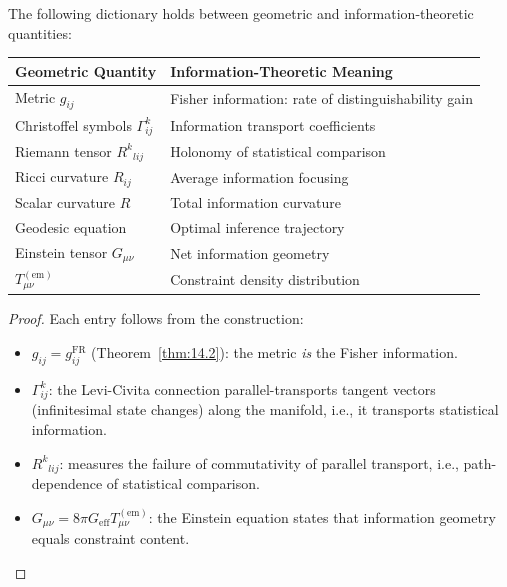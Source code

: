 \begin{theorem}\label{thm:14.10}
The following dictionary holds between geometric and
information-theoretic quantities:
\begin{center}
\renewcommand{\arraystretch}{1.3}
\begin{tabular}{ll}
\toprule
\textbf{Geometric Quantity} & \textbf{Information-Theoretic Meaning} \\
\midrule
Metric $g_{ij}$ &
  Fisher information: rate of distinguishability gain \\
Christoffel symbols $\Gamma^k_{ij}$ &
  Information transport coefficients \\
Riemann tensor $R^k{}_{lij}$ &
  Holonomy of statistical comparison \\
Ricci curvature $R_{ij}$ &
  Average information focusing \\
Scalar curvature $R$ &
  Total information curvature \\
Geodesic equation &
  Optimal inference trajectory \\
Einstein tensor $G_{\mu\nu}$ &
  Net information geometry \\
$T_{\mu\nu}^{(\mathrm{em})}$ &
  Constraint density distribution \\
\bottomrule
\end{tabular}
\end{center}
\end{theorem}

\begin{proof}
Each entry follows from the construction:
\begin{itemize}
  \item $g_{ij} = g_{ij}^{\mathrm{FR}}$ (Theorem~\ref{thm:14.2}): the
        metric \emph{is} the Fisher information.
  \item $\Gamma^k_{ij}$: the Levi-Civita connection parallel-transports
        tangent vectors (infinitesimal state changes) along the manifold,
        i.e., it transports statistical information.
  \item $R^k{}_{lij}$: measures the failure of commutativity of
        parallel transport, i.e., path-dependence of statistical
        comparison.
  \item $G_{\mu\nu} = 8\pi G_{\mathrm{eff}} T_{\mu\nu}^{(\mathrm{em})}$:
        the Einstein equation states that information geometry equals
        constraint content.
\end{itemize}
\end{proof}

